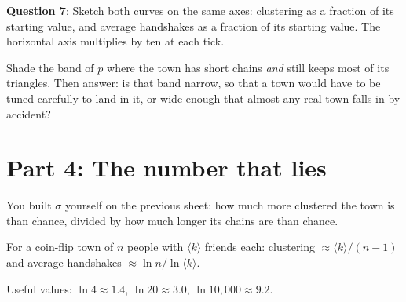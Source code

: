 \documentclass[a4paper, 14pt]{extarticle}
\begin{document}
\clearpage

{\bf Question 7}:
Sketch both curves on the same axes: clustering as a fraction of its starting
value, and average handshakes as a fraction of its starting value. The
horizontal axis multiplies by ten at each tick.

\begin{center}
\end{center}

Shade the band of $p$ where the town has short chains \emph{and} still keeps
most of its triangles. Then answer: is that band narrow, so that a town would
have to be tuned carefully to land in it, or wide enough that almost any real
town falls in by accident?

\underline{\hspace{\textwidth}}

\clearpage

\section*{Part 4: The number that lies}

You built $\sigma$ yourself on the previous sheet: how much more clustered the
town is than chance, divided by how much longer its chains are than chance.

\begin{center}
\begin{tcolorbox}[width=0.85\textwidth, colback=white]
For a coin-flip town of $n$ people with $\langle k \rangle$ friends each:
clustering $\approx \langle k \rangle / (n-1)$ and average handshakes
$\approx \ln n / \ln \langle k \rangle$.

Useful values: $\ln 4 \approx 1.4$, \; $\ln 20 \approx 3.0$, \;
$\ln 10{,}000 \approx 9.2$.
\end{tcolorbox}
\end{center}
\end{document}
